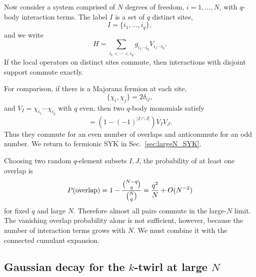\documentclass{article}
\theoremstyle{definition}
\begin{document}
Now consider a system comprised of $N$ degrees of freedom,
$i=1,\ldots,N$, with $q$-body interaction terms.  The label $I$ is a set
of $q$ distinct sites,
\begin{equation}
    I=\{i_1,\ldots,i_q\},
\end{equation}
and we write
\begin{equation}
    H
    =\sum_{i_1<\cdots<i_q}
    g_{i_1\cdots i_q}V_{i_1\cdots i_q}.
\end{equation}
If the local operators on distinct sites commute, then interactions with
disjoint support commute exactly.

For comparison, if there is a Majorana fermion at each site,
\begin{equation}
    \{\chi_i,\chi_j\}=2\delta_{ij},
\end{equation}
and $V_I=\chi_{i_1}\cdots\chi_{i_q}$ with $q$ even, then two $q$-body
monomials satisfy
\begin{equation}
    [V_I,V_J]
    =\left(1-(-1)^{|I\cap J|}\right)V_IV_J.
\end{equation}
Thus they commute for an even number of overlaps and anticommute for an odd
number.  We return to fermionic SYK in Sec.~\ref{sec:largeN_SYK}.

Choosing two random $q$-element subsets $I,J$, the probability of at least
one overlap is
\begin{equation}
    P({\rm overlap})
    =1-\frac{\binom{N-q}{q}}{\binom Nq}
    =\frac{q^2}{N}+O(N^{-2})
\end{equation}
for fixed $q$ and large $N$.  Therefore almost all pairs commute in the
large-$N$ limit.  The vanishing overlap probability alone is not sufficient,
however, because the number of interaction terms grows with $N$.  We must
combine it with the connected cumulant expansion.


\subsection{Gaussian decay for the $k$-twirl at large $N$}
\label{subsec:quenched_syk_gaussian_regulator}
\end{document}
